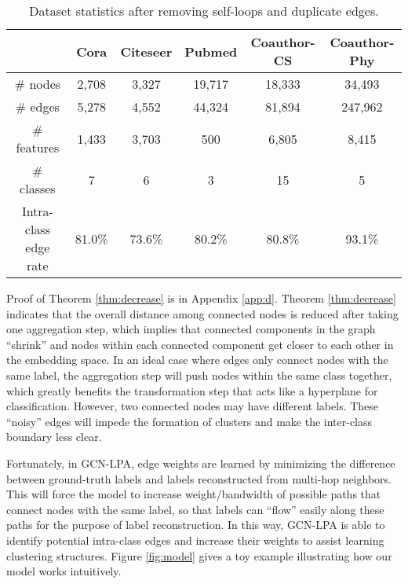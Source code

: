 \documentclass{article}
\begin{document}
		\begin{table*}[t]
			\centering
			\setlength{\tabcolsep}{12pt}
			\begin{tabular}{c|ccccc}
				\hline
				& \textbf{Cora} & \textbf{Citeseer} & \textbf{Pubmed} & \textbf{Coauthor-CS} & \textbf{Coauthor-Phy} \\
				\hline
				\# nodes & 2,708 & 3,327 & 19,717 & 18,333 & 34,493 \\
				\# edges & 5,278 & 4,552 & 44,324 & 81,894 & 247,962 \\
				\# features & 1,433 & 3,703 & 500 & 6,805 & 8,415 \\
				\# classes & 7 & 6 & 3 & 15 & 5 \\
				Intra-class edge rate & 81.0\% & 73.6\% & 80.2\% & 80.8\% & 93.1\% \\
				\hline
			\end{tabular}
			\caption{Dataset statistics after removing self-loops and duplicate edges.}
			\label{table:statistics}
		\end{table*}
	
		Proof of Theorem \ref{thm:decrease} is in Appendix \ref{app:d}.
		Theorem \ref{thm:decrease} indicates that the overall distance among connected nodes is reduced after taking one aggregation step, which implies that connected components in the graph ``shrink'' and nodes within each connected component get closer to each other in the embedding space.
		In an ideal case where edges only connect nodes with the same label, the aggregation step will push nodes within the same class together, which greatly benefits the transformation step that acts like a hyperplane  for classification.
		However, two connected nodes may have different labels.
		These ``noisy'' edges will impede the formation of clusters and make the inter-class boundary less clear.


		Fortunately, in GCN-LPA, edge weights are learned by minimizing the difference between ground-truth labels and labels reconstructed from multi-hop neighbors.
		This will force the model to increase weight/bandwidth of possible paths that connect nodes with the same label, so that labels can ``flow'' easily along these paths for the purpose of label reconstruction.
		In this way, GCN-LPA is able to identify potential intra-class edges and increase their weights to assist learning clustering structures.
		Figure \ref{fig:model} gives a toy example illustrating how our model works intuitively.
		
\end{document}
